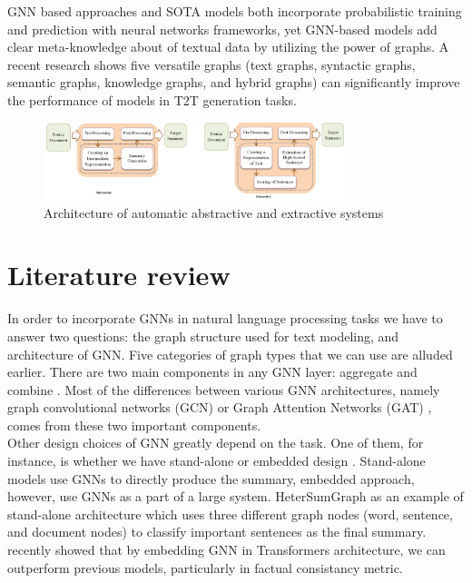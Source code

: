 \documentclass[12pt,onecolumn,a4paper]{article}
\begin{document}
GNN based approaches and SOTA models both incorporate probabilistic training and prediction with neural networks frameworks, yet GNN-based models add clear meta-knowledge about of textual data by utilizing the power of graphs. A recent research shows \citep{GNNBook-ch21-liu} five versatile graphs (text graphs, syntactic graphs, semantic graphs, knowledge graphs, and hybrid graphs) can significantly improve the performance of models in T2T generation tasks.

\begin{figure}[ht]
\centering
\includegraphics[width=0.8\textwidth]{Abs_Ext_architecture.jpg}
\caption{Architecture of automatic abstractive and extractive systems \cite{wafaa}}
\label{figure:abs_ext_arch}
\end{figure}




\section{Literature review}
\noindent In order to incorporate GNNs in natural language processing tasks we have to answer two questions: the graph structure used for text modeling, and architecture of GNN. Five categories of graph types that we can use are alluded earlier. There are two main components in any GNN layer: aggregate and combine \citep{GNNBook-ch4-tang}. Most of the differences between various GNN architectures, namely graph convolutional networks (GCN) \citep{GCN} or Graph Attention Networks (GAT) \citep{GAT}, comes from these two important components.\\ 

Other design choices of GNN greatly depend on the task. One of them, for instance, is whether we have stand-alone or embedded design \citep{salchner2022survey}. Stand-alone models use GNNs to directly produce the summary, embedded approach, however, use GNNs as a part of a large system. HeterSumGraph \citep{wang-etal-2020-heterogeneous} as an example of stand-alone  architecture which uses three different graph nodes (word, sentence, and document nodes) to classify important sentences as the final summary.\citep{FAsum2021} recently showed that by embedding GNN in Transformers architecture, we can outperform previous models, particularly in factual consistancy metric.\\
\end{document}
